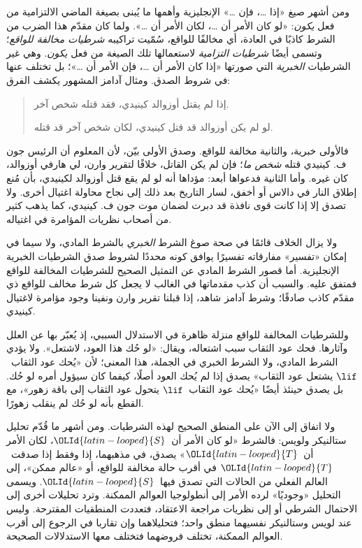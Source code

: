\documentclass[../../../include/open-logic-section]{subfiles}
\begin{document}


ومن أشهر صيغ «إذا \dots، فإن \dots» الإنجليزية وأهمها ما يُبنى بصيغة
الماضي الالتزامية من فعل \emph{يكون}: «لو كان الأمر أن \dots، لكان
الأمر أن \dots». ولما كان مقدّم هذا الضرب من الشرط كاذبًا في العادة،
أي مخالفًا للواقع، سُمّيت تراكيبه \emph{شرطيات مخالفة للواقع}؛ وتسمى
أيضًا \emph{شرطيات التزامية} لاستعمالها تلك الصيغة من فعل \emph{يكون}.
وهي غير الشرطيات \emph{الخبرية} التي صورتها «إذا كان الأمر أن \dots،
فإن الأمر أن \dots»؛ بل تختلف عنها في شروط الصدق. ومثال آدامز المشهور
يكشف الفرق:
\begin{quote}
  إذا لم يقتل أوزوالد كينيدي، فقد قتله شخص آخر.
  
  لو لم يكن أوزوالد قد قتل كينيدي، لكان شخص آخر قد قتله.
\end{quote}
فالأولى خبرية، والثانية مخالفة للواقع. وصدق الأولى بيّن، لأن المعلوم أن
الرئيس جون ف. كينيدي قتله \emph{شخص ما}؛ فإن لم يكن القاتل، خلافًا
لتقرير وارن، لي هارفي أوزوالد، كان غيره. وأما الثانية فدعواها أبعد:
مؤداها أنه لو لم يقع قتل أوزوالد لكينيدي، بأن مُنع إطلاق النار في دالاس
أو أخفق، لسار التاريخ بعد ذلك إلى نجاح محاولة اغتيال أخرى. ولا تصدق
إلا إذا كانت قوى نافذة قد دبرت لضمان موت جون ف. كينيدي، كما يذهب كثير
من أصحاب نظريات المؤامرة في اغتياله.

ولا يزال الخلاف قائمًا في صحة صوغ الشرط \emph{الخبري} بالشرط المادي،
ولا سيما في إمكان «تفسير» مفارقاته تفسيرًا يوافق كونه محددًا لشروط صدق
الشرطيات الخبرية الإنجليزية. أما قصور الشرط المادي عن التمثيل الصحيح
للشرطيات المخالفة للواقع فمتفق عليه. والسبب أن كذب مقدماتها في الغالب
لا يجعل كل شرط مخالف للواقع ذي مقدّم كاذب صادقًا؛ وشرط آدامز شاهد، إذا
قبلنا تقرير وارن ونفينا وجود مؤامرة لاغتيال كينيدي.

وللشرطيات المخالفة للواقع منزلة ظاهرة في الاستدلال السببي، إذ يُعبّر
بها عن العلل وآثارها. فحك عود الثقاب سبب اشتعاله، ويقال: «لو حُك هذا
العود، لاشتعل». ولا يؤدي الشرط المادي، ولا الشرط الخبري في الجملة، هذا
المعنى؛ لأن «يُحك عود الثقاب~$\lif$ يشتعل عود الثقاب» يصدق إذا لم
يُحك العود أصلًا، كيفما كان سيؤول أمره لو حُك. بل يصدق حينئذ أيضًا
«يُحك عود الثقاب~$\lif$ يتحول عود الثقاب إلى باقة زهور»، مع القطع بأنه
لو حُك لم ينقلب زهورًا.

ولا اتفاق إلى الآن على المنطق الصحيح لهذه الشرطيات. ومن أشهر ما قُدّم
تحليل ستالنيكر ولويس: فالشرط «لو كان الأمر أن~$\OLId{latin-looped}{S}$، لكان الأمر أن~$\OLId{latin-looped}{T}$»
يصدق، في مذهبهما، إذا وفقط إذا صدقت~$\OLId{latin-looped}{T}$ في أقرب حالة مخالفة للواقع، أو
«عالم ممكن»، إلى العالم الفعلي من الحالات التي تصدق فيها~$\OLId{latin-looped}{S}$. ويسمى
التحليل «وجوديًا» لرده الأمر إلى أنطولوجيا العوالم الممكنة. وترد تحليلات
أخرى إلى الاحتمال الشرطي أو إلى نظريات مراجعة الاعتقاد، فتعددت المنطقيات
المقترحة. وليس عند لويس وستالنيكر نفسيهما منطق واحد؛ فتحليلاهما وإن
تقاربا في الرجوع إلى أقرب العوالم الممكنة، تختلف فروضهما فتختلف معها
الاستدلالات الصحيحة.
\end{document}
